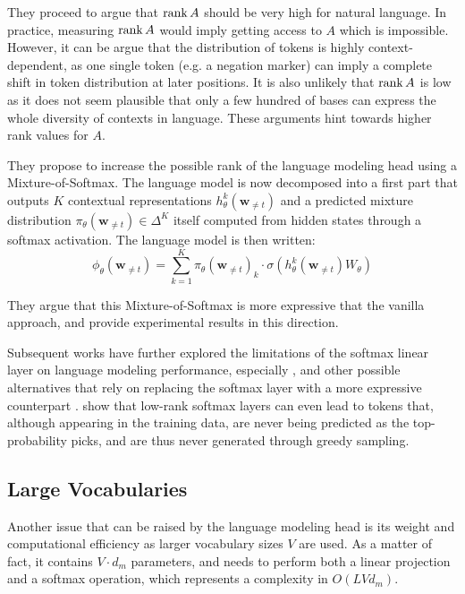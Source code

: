 They proceed to argue that $\operatorname{rank} A$ should be very high for natural language. In practice, measuring $\operatorname{rank} A$ would imply getting access to $A$ which is impossible. However, it can be argue that the distribution of tokens is highly context-dependent, as one single token (e.g. a negation marker) can imply a complete shift in token distribution at later positions. It is also unlikely that $\operatorname{rank} A$ is low as it does not seem plausible that only a few hundred of bases can express the whole diversity of contexts in language. These arguments hint towards higher rank values for $A$.

They propose to increase the possible rank of the language modeling head using a Mixture-of-Softmax. The language model is now decomposed into a first part that outputs $K$ contextual representations $h^k_\theta(\mathbf{w}_{\neq t})$ and a predicted mixture distribution $\pi_\theta(\mathbf{w}_{\neq t}) \in \Delta^K$ itself computed from hidden states through a softmax activation. The language model is then written:
$$
\phi_\theta(\mathbf{w}_{\neq t}) = \sum_{k=1}^K \pi_\theta(\mathbf{w}_{\neq t})_k \cdot \sigma \left(h^k_\theta(\mathbf{w}_{\neq t}) W_\theta\right)
$$

They argue that this Mixture-of-Softmax is more expressive that the vanilla approach, and provide experimental results in this direction.

Subsequent works have further explored the limitations of the softmax linear layer on language modeling performance, especially  \citet{chang-mccallum-2022-softmax}, and other possible alternatives that rely on replacing the softmax layer with a more expressive counterpart \citep{lin2021breaking,sigsoftmax}. \citet{grivas-etal-2022-low} show that low-rank softmax layers can even lead to tokens that, although appearing in the training data, are never being predicted as the top-probability picks, and are thus never generated through greedy sampling.


\subsection{Large Vocabularies}
\label{ssec:large_voc}

Another issue that can be raised by the language modeling head is its weight and computational efficiency as larger vocabulary sizes $V$ are used. As a matter of fact, it contains $V \cdot d_m$ parameters, and needs to perform both a linear projection and a softmax operation, which represents a complexity in $O(LVd_m)$.

